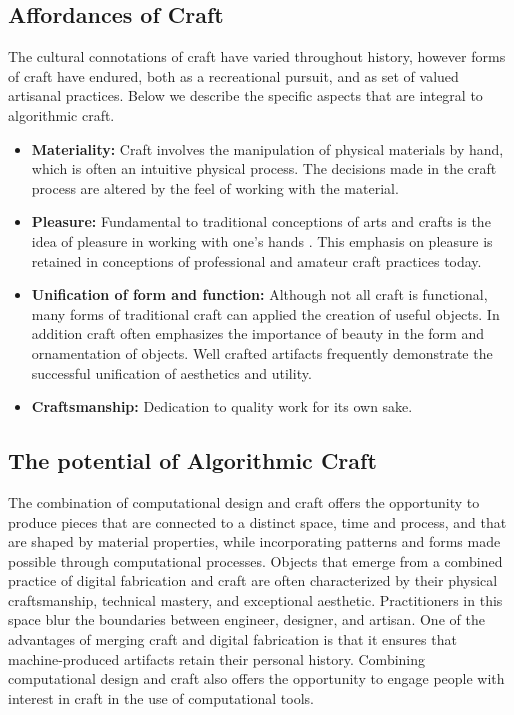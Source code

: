 \documentclass{sigchi}
\begin{document}
\subsection{Affordances of Craft}
The cultural connotations of craft have varied throughout history, however forms of craft have endured, both as a recreational pursuit, and as set of valued artisanal practices. Below we describe the specific aspects that are integral to algorithmic craft.
\begin{itemize}
\item \textbf{Materiality:} Craft involves the manipulation of physical materials by hand, which is often an intuitive physical process. The decisions made in the craft process are altered by the feel of working with the material. 

\item \textbf{Pleasure:} Fundamental to traditional conceptions of arts and crafts is the idea of pleasure in working with one's hands \cite{abstracting_craft}. This emphasis on pleasure is retained in conceptions of professional and amateur craft practices today.

\item \textbf{Unification of form and function:} Although not all craft is functional, many forms of traditional craft can applied the creation of useful objects. In addition craft often emphasizes the importance of beauty in the form and ornamentation of objects. Well crafted artifacts frequently demonstrate the successful unification of aesthetics and utility.

\item \textbf{Craftsmanship:} Dedication to quality work for its own sake. 
\end{itemize}

\subsection{The potential of Algorithmic Craft}
The combination of computational design and craft offers the opportunity to produce pieces that are connected to a distinct space, time and process, and that are shaped by material properties, while incorporating patterns and forms made possible through computational processes. Objects that emerge from a combined practice of digital fabrication and craft are often characterized by their physical craftsmanship, technical mastery, and exceptional aesthetic. Practitioners in this space blur the boundaries between engineer, designer, and artisan. One of the advantages of merging craft and digital fabrication is that it ensures that machine-produced artifacts retain their personal history. Combining computational design and craft also offers the opportunity to engage people with interest in craft in the use of computational tools.
\end{document}
